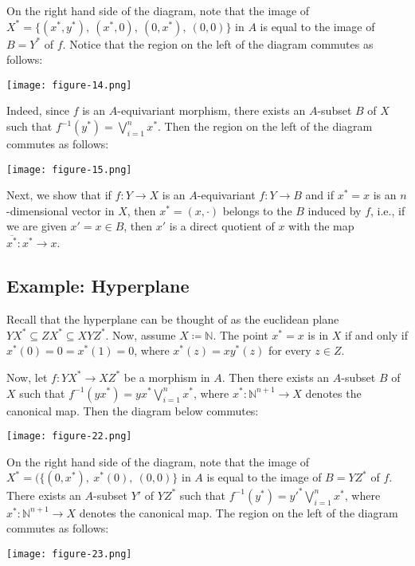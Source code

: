 \documentclass[a4paper,reqno,oneside]{article}
\begin{document}
On the right hand side of the diagram, note that the image of $X^*=\{(x^*,y^*),\ (x^*,0),\ (0,x^*),\ (0,0)\}$ in $A$ is equal to the image of $B=Y^*$ of $f$. Notice that the region on the left of the diagram commutes as follows:

\begin{center} 
\texttt{[image: figure-14.png]}
\end{center}

Indeed, since $f$ is an $A$-equivariant morphism, there exists an $A$-subset $B$ of $X$ such that $f^{-1}(y^*)=\bigvee_{i=1}^n x^*$. Then the region on the left of the diagram commutes as follows:

\begin{center} 
\texttt{[image: figure-15.png]}
\end{center}

Next, we show that if $f:Y\to X$ is an $A$-equivariant $f:Y\to B$ and if $x^*=x$ is an $n$-dimensional vector in $X$, then $x^*=(x,\cdot)$ belongs to the $B$ induced by $f$, i.e., if we are given $x'=x\in B$, then $x'$ is a direct quotient of $x$ with the map $\overline{x^*}:x^*\to x$. 


\subsection{Example: Hyperplane} 
Recall that the hyperplane can be thought of as the euclidean plane $YX^*\subseteq ZX^*\subseteq XYZ^*$. Now, assume $X\coloneqq\mathbb{N}$. The point $x^*=x$ is in $X$ if and only if $x^*(0)=0=x^*(1)=0$, where $x^*(z)=xy^*(z)$ for every $z\in Z$. 

Now, let $f:YX^*\to XZ^*$ be a morphism in $A$. Then there exists an $A$-subset $B$ of $X$ such that $f^{-1}(yx^*)=yx^*\bigvee_{i=1}^n x^*$, where $x^*:\mathbb{N}^{n+1}\to X$ denotes the canonical map. Then the diagram below commutes: 

\begin{center} 
\texttt{[image: figure-22.png]}
\end{center}

On the right hand side of the diagram, note that the image of $X^*=(\{(0,x^*),\ x^*(0),\ (0,0)\}$ in $A$ is equal to the image of $B=YZ^*$ of $f$.  There exists an $A$-subset $Y'$ of $YZ^*$ such that $f^{-1}(y^*)=y'^*\bigvee_{i=1}^n x^*$, where $x^*:\mathbb{N}^{n+1}\to X$ denotes the canonical map. The region on the left of the diagram commutes as follows: 

\begin{center} 
\texttt{[image: figure-23.png]}
\end{center}
\end{document}
